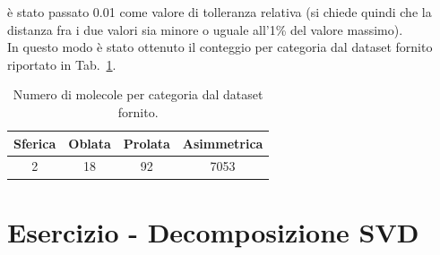\documentclass[a4paper]{article}
\newcounter{count_es}
\newcounter{count_sub_es}[count_es]
\renewcommand{\tablename}{Tab.}
\begin{document}
è stato passato 0.01 come valore di tolleranza relativa (si chiede quindi che la distanza fra i due valori sia minore o uguale all'1\% del valore massimo). \\
In questo modo è stato ottenuto il conteggio per categoria dal dataset fornito riportato in \tablename~\ref{tab:es_1c}.
\begin{table}[H]
    \centering
    \setlength{\tabcolsep}{10pt}  %
    \renewcommand{\arraystretch}{1.25} %
    \begin{tabular}{ c | c | c | c}
        \textbf{Sferica} & \textbf{Oblata} & \textbf{Prolata} & \textbf{Asimmetrica}\\
        \hline
         2 & 18 & 92 & 7053  \\
    \end{tabular}
    \caption{Numero di molecole per categoria dal dataset fornito.\label{tab:es_1c}}
\end{table}

\section*{Esercizio  - Decomposizione SVD}
\end{document}
